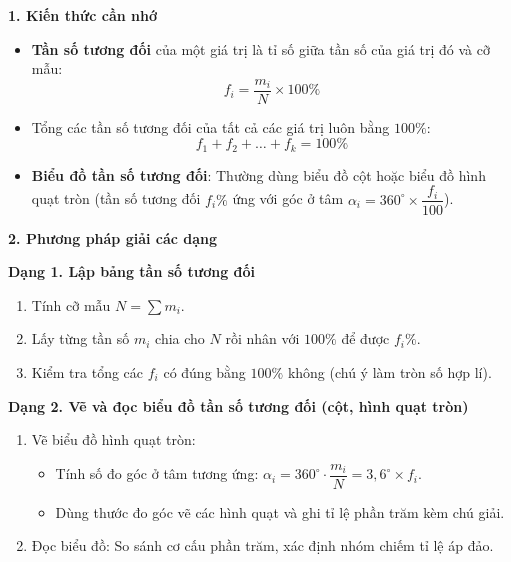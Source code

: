\textbf{1. Kiến thức cần nhớ}
\begin{itemize}
\item \textbf{Tần số tương đối} của một giá trị là tỉ số giữa tần số của giá trị đó và cỡ mẫu:
$$\boxed{f_i = \dfrac{m_i}{N} \times 100\%}$$
\item Tổng các tần số tương đối của tất cả các giá trị luôn bằng $100\%$:
$$\boxed{f_1 + f_2 + \dots + f_k = 100\%}$$
\item \textbf{Biểu đồ tần số tương đối}: Thường dùng biểu đồ cột hoặc biểu đồ hình quạt tròn (tần số tương đối $f_i\%$ ứng với góc ở tâm $\alpha_i = 360^\circ \times \dfrac{f_i}{100}$).
\end{itemize}

\textbf{2. Phương pháp giải các dạng}

\textbf{Dạng 1. Lập bảng tần số tương đối}
\begin{enumerate}
\item Tính cỡ mẫu $N = \sum m_i$.
\item Lấy từng tần số $m_i$ chia cho $N$ rồi nhân với $100\%$ để được $f_i\%$.
\item Kiểm tra tổng các $f_i$ có đúng bằng $100\%$ không (chú ý làm tròn số hợp lí).
\end{enumerate}

\textbf{Dạng 2. Vẽ và đọc biểu đồ tần số tương đối (cột, hình quạt tròn)}
\begin{enumerate}
\item Vẽ biểu đồ hình quạt tròn:
\begin{itemize}
\item Tính số đo góc ở tâm tương ứng: $\alpha_i = 360^\circ \cdot \dfrac{m_i}{N} = 3{,}6^\circ \times f_i$.
\item Dùng thước đo góc vẽ các hình quạt và ghi tỉ lệ phần trăm kèm chú giải.
\end{itemize}
\item Đọc biểu đồ: So sánh cơ cấu phần trăm, xác định nhóm chiếm tỉ lệ áp đảo.
\end{enumerate}
